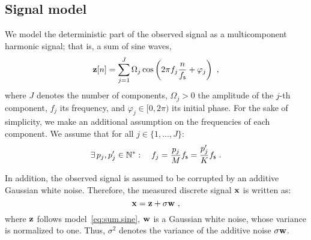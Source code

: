 \subsection{Signal model}
We model the deterministic part of the observed signal as a multicomponent harmonic signal; that is, a sum of sine waves,
\begin{equation}
\bz[n]=\sum_{j=1}^J\Omega_j\cos\left(2\pi f_j \frac{n}{\fs} + \varphi_j\right)\ ,
\label{eq:sum.sine}
\end{equation}
where $J$ denotes the number of components, $\Omega_j>0$ the amplitude of the $j$-th component, $f_j$ its frequency, and $\varphi_j\in[0,2\pi)$ its initial phase.
%
For the sake of simplicity, we make an additional assumption on the frequencies of each component. We assume that for all $j\in\{1,\dots,J\}$:
\begin{equation}
\exists\, p_j,p_j'\in\mathbb N^*: \quad f_j = \dfrac{p_j}{M}f_{\mathsf s} = \dfrac{p'_j}{K}f_{\mathsf s}\ .
\end{equation}


In addition, the observed signal is assumed to be corrupted by an additive Gaussian white noise. Therefore, the measured discrete signal ${\mathbf x}$ is written as:
\begin{equation}
\bx = \bz + \sigma\bw\ ,
\label{eq:model.noise}
\end{equation}
where ${\mathbf z}$ follows model~\eqref{eq:sum.sine}, ${\mathbf w}$ is a Gaussian white noise, whose variance is normalized to one. Thus, $\sigma^2$ denotes the variance of the additive noise $\sigma{\mathbf w}$.

